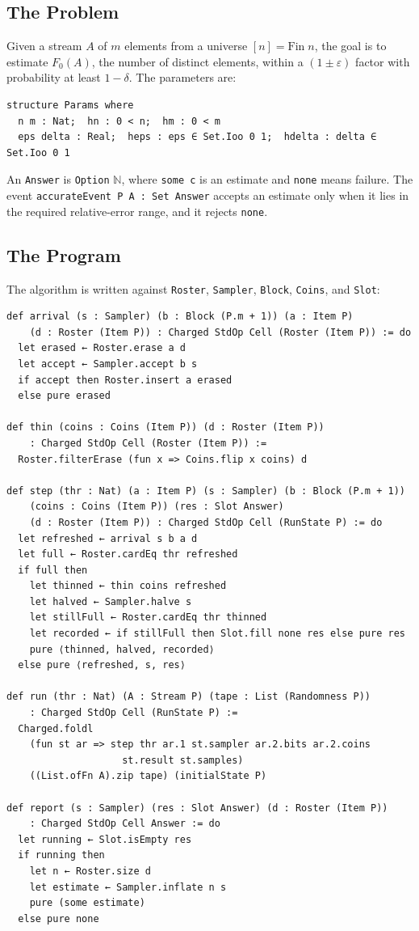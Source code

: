 \documentclass[acmsmall,nonacm]{acmart}
\begin{document}
\subsection{The Problem}\label{sec:problem}

Given a stream $A$ of $m$ elements from a universe $[n] = \text{Fin}\; n$, the goal is to estimate $F_0(A)$, the number of distinct elements, within a $(1 \pm \varepsilon)$ factor with probability at least $1 - \delta$.
The parameters are:

\begin{lstlisting}
structure Params where
  n m : Nat;  hn : 0 < n;  hm : 0 < m
  eps delta : Real;  heps : eps ∈ Set.Ioo 0 1;  hdelta : delta ∈ Set.Ioo 0 1
\end{lstlisting}

An \lstinline{Answer} is \lstinline{Option} $\mathbb{N}$, where \lstinline{some c} is an estimate and \lstinline{none} means failure.
The event \lstinline{accurateEvent P A : Set Answer} accepts an estimate only when it lies in the required relative-error range, and it rejects \lstinline{none}.

\subsection{The Program}\label{sec:program}

The algorithm is written against \lstinline{Roster}, \lstinline{Sampler}, \lstinline{Block}, \lstinline{Coins}, and \lstinline{Slot}:

\begin{lstlisting}
def arrival (s : Sampler) (b : Block (P.m + 1)) (a : Item P)
    (d : Roster (Item P)) : Charged StdOp Cell (Roster (Item P)) := do
  let erased ← Roster.erase a d
  let accept ← Sampler.accept b s
  if accept then Roster.insert a erased
  else pure erased

def thin (coins : Coins (Item P)) (d : Roster (Item P))
    : Charged StdOp Cell (Roster (Item P)) :=
  Roster.filterErase (fun x => Coins.flip x coins) d

def step (thr : Nat) (a : Item P) (s : Sampler) (b : Block (P.m + 1))
    (coins : Coins (Item P)) (res : Slot Answer)
    (d : Roster (Item P)) : Charged StdOp Cell (RunState P) := do
  let refreshed ← arrival s b a d
  let full ← Roster.cardEq thr refreshed
  if full then
    let thinned ← thin coins refreshed
    let halved ← Sampler.halve s
    let stillFull ← Roster.cardEq thr thinned
    let recorded ← if stillFull then Slot.fill none res else pure res
    pure ⟨thinned, halved, recorded⟩
  else pure ⟨refreshed, s, res⟩

def run (thr : Nat) (A : Stream P) (tape : List (Randomness P))
    : Charged StdOp Cell (RunState P) :=
  Charged.foldl
    (fun st ar => step thr ar.1 st.sampler ar.2.bits ar.2.coins
                    st.result st.samples)
    ((List.ofFn A).zip tape) (initialState P)

def report (s : Sampler) (res : Slot Answer) (d : Roster (Item P))
    : Charged StdOp Cell Answer := do
  let running ← Slot.isEmpty res
  if running then
    let n ← Roster.size d
    let estimate ← Sampler.inflate n s
    pure (some estimate)
  else pure none
\end{lstlisting}
\end{document}
